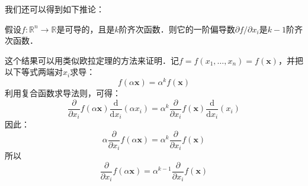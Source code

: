 我们还可以得到如下推论：
\begin{corollary}{}
假设$f:\mathbb{R}^n \to \mathbb{R}$是可导的，且是$ k $阶齐次函数．则它的一阶偏导数$\partial f/\partial x_i$是$k-1$阶齐次函数．

这个结果可以用类似欧拉定理的方法来证明．记$ f=f(x_{1},\ldots ,x_{n})=f(\mathbf {x} )$，并把以下等式两端对$x_{i}$求导：
\begin{equation}
f(\alpha \mathbf {x} )=\alpha ^{k}f(\mathbf {x} )
\end{equation}
利用复合函数求导法则，可得：
\begin{equation}
\frac {\partial }{\partial x_{i}}f(\alpha \mathbf {x} ){\frac {\mathrm {d} }{\mathrm {d} x_{i}}}(\alpha x_{i})=\alpha ^{k}{\frac {\partial }{\partial x_{i}}}f(\mathbf {x} ){\frac {\mathrm {d} }{\mathrm {d} x_{i}}}(x_{i})
\end{equation}
因此：
\begin{equation}
\alpha {\frac {\partial }{\partial x_{i}}}f(\alpha \mathbf {x} )=\alpha ^{k}{\frac {\partial }{\partial x_{i}}}f(\mathbf {x} )
\end{equation}
所以
\begin{equation}
{\frac {\partial }{\partial x_{i}}}f(\alpha \mathbf {x} )=\alpha ^{k-1}{\frac {\partial }{\partial x_{i}}}f(\mathbf {x} )
\end{equation}
\end{corollary}